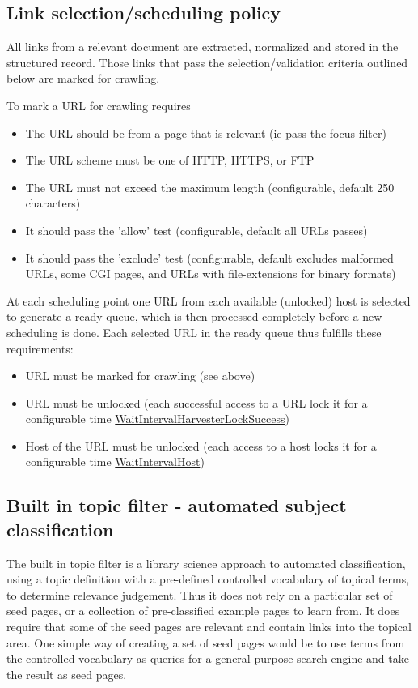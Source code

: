 \subsection{Link selection/scheduling policy}
\label{sched}
All links from a relevant document are extracted, normalized and stored
in the structured record. Those links that pass the selection/validation
criteria outlined below are marked for crawling.

To mark a URL for crawling requires
\begin{itemize}
\item The URL should be from a page that is relevant (ie pass the focus filter)
\item The URL scheme must be one of HTTP, HTTPS, or FTP
\item The URL must not exceed the maximum length (configurable, default 250 characters)
\item It should pass the 'allow' test (configurable, default all URLs passes)
\item It should pass the 'exclude' test (configurable, default excludes malformed URLs, some CGI pages, and URLs with file-extensions for binary formats)
\end{itemize}

At each scheduling point one URL from each available (unlocked) host is selected to 
generate a ready queue, which is then processed completely 
before a new scheduling is done.
Each selected URL in the ready queue thus fulfills these requirements:
\begin{itemize}
\item URL must be marked for crawling (see above)
\item URL must be unlocked (each successful access to a URL lock it for
a configurable time \hyperref{WaitIntervalHarvesterLockSuccess}{WaitIntervalHarvesterLockSuccess (section }{)}{WaitIntervalHarvesterLockSuccess})
\item Host of the URL must be unlocked (each access to a host locks it for a configurable time \hyperref{WaitIntervalHost}{WaitIntervalHost (section }{)}{WaitIntervalHost})
\end{itemize}

\subsection{Built in topic filter - automated subject classification}
\label{autoclass}
The built in topic filter is a library science approach to automated classification,
using a topic definition with a pre-defined controlled vocabulary of
topical terms, to determine relevance judgement. Thus it does not rely
on a particular set of seed pages, or a collection of pre-classified
example pages to learn from. It does require that some of the seed pages
are relevant and contain links into the topical area.
One simple way of creating a set of seed pages would be to use terms
from the controlled vocabulary as queries for a general purpose search
engine and take the result as seed pages.

